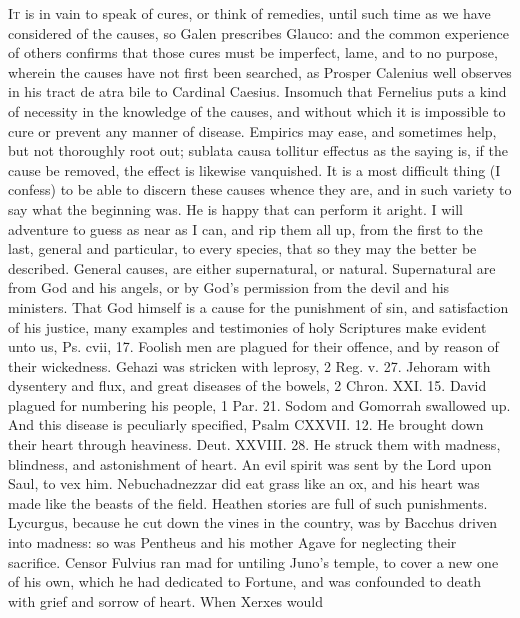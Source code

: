 {\lettrine{I}{t} is in vain to speak of cures, or think of remedies, until such time
as we have considered of the causes, so Galen prescribes Glauco:
and the common experience of others confirms that those cures must be
imperfect, lame, and to no purpose, wherein the causes have not first
been searched, as Prosper Calenius well observes in his tract de
atra bile to Cardinal Caesius. Insomuch that Fernelius puts a
kind of necessity in the knowledge of the causes, and without which it
is impossible to cure or prevent any manner of disease. Empirics may
ease, and sometimes help, but not thoroughly root out; sublata causa
tollitur effectus as the saying is, if the cause be removed, the effect
is likewise vanquished. It is a most difficult thing (I confess) to be
able to discern these causes whence they are, and in such variety
to say what the beginning was. He is happy that can perform it
aright. I will adventure to guess as near as I can, and rip them all
up, from the first to the last, general and particular, to every
species, that so they may the better be described.
General causes, are either supernatural, or natural. Supernatural are
from God and his angels, or by God's permission from the devil and his
ministers. That God himself is a cause for the punishment of sin, and
satisfaction of his justice, many examples and testimonies of holy
Scriptures make evident unto us, Ps. cvii, 17. Foolish men are plagued
for their offence, and by reason of their wickedness. Gehazi was
stricken with leprosy, 2 Reg. v. 27. Jehoram with dysentery and flux,
and great diseases of the bowels, 2 Chron. XXI. 15. David plagued for
numbering his people, 1 Par. 21. Sodom and Gomorrah swallowed up. And
this disease is peculiarly specified, Psalm CXXVII. 12. He brought down
their heart through heaviness. Deut. XXVIII. 28. He struck them with
madness, blindness, and astonishment of heart. An evil spirit was
sent by the Lord upon Saul, to vex him. Nebuchadnezzar did eat
grass like an ox, and his heart was made like the beasts of the field.
Heathen stories are full of such punishments. Lycurgus, because he cut
down the vines in the country, was by Bacchus driven into madness: so
was Pentheus and his mother Agave for neglecting their sacrifice.
Censor Fulvius ran mad for untiling Juno's temple, to cover a new
one of his own, which he had dedicated to Fortune, and was
confounded to death with grief and sorrow of heart. When Xerxes would
}
